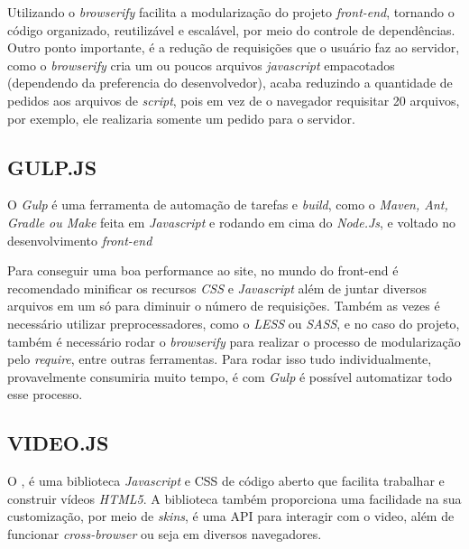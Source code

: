 Utilizando o \textit{browserify} facilita a modularização do projeto \textit{front-end}, tornando o código organizado, reutilizável e escalável, por meio do controle de dependências. Outro ponto importante, é a redução de requisições que o usuário faz ao servidor, como o \textit{browserify} cria um ou poucos arquivos \textit{javascript} empacotados (dependendo da preferencia do desenvolvedor), acaba reduzindo a quantidade de pedidos aos arquivos de \textit{script}, pois em vez de o navegador requisitar 20 arquivos, por exemplo, ele realizaria somente um pedido para o servidor.

\subsection{GULP.JS}
\label{sec:gulp}

O \textit{Gulp} é uma ferramenta de automação de tarefas e \textit{build}, como o \textit{Maven, Ant, Gradle ou Make} feita em \textit{Javascript} e rodando em cima do \textit{Node.Js}, e voltado no desenvolvimento \textit{front-end} \cite{souza-gulp}

Para conseguir uma boa performance ao site, no mundo do front-end é recomendado minificar os recursos \textit{CSS} e \textit{Javascript}  além de juntar diversos arquivos em um só para diminuir o número de requisições. Também as vezes é necessário utilizar preprocessadores, como o \textit{LESS} ou \textit{SASS}, e no caso do projeto, também é necessário rodar o \textit{browserify} para realizar o processo de modularização pelo \textit{require}, entre outras ferramentas. Para rodar isso tudo individualmente, provavelmente consumiria muito tempo, é com \textit{Gulp} é possível automatizar todo esse processo.

\subsection{VIDEO.JS}
\label{sec:videojs}

O , é uma biblioteca \textit{Javascript} e \ac{CSS} de código aberto que facilita trabalhar e construir vídeos \textit{HTML5}. A biblioteca também proporciona uma facilidade na sua customização, por meio de \textit{skins}, é uma \ac{API} para interagir com o video, além de funcionar \textit{cross-browser} ou seja em diversos navegadores.

\newpage
